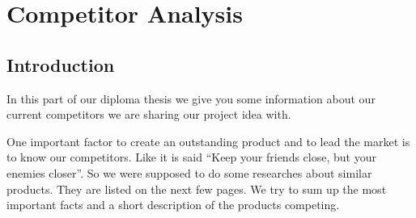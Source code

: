 \chapter{Competitor Analysis}
\section{Introduction}
In this part of our diploma thesis we give you some information about our current competitors we are sharing our project idea with.

One important factor to create an outstanding product and to lead the market is to know our competitors. Like it is said “Keep your friends close, but your enemies closer”. So we were supposed to do some researches about similar products. They are listed on the next few pages. We try to sum up the most important facts and a short description of the products competing. 

